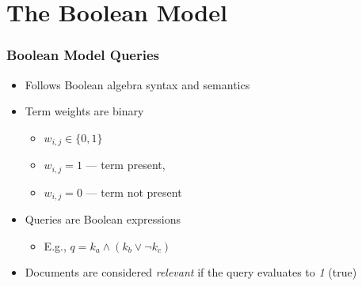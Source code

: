 \documentclass[svgnames]{beamer}
\newcommand{\wij}{\ensuremath{w_{i,j}}}
\begin{document}

\section{The Boolean Model}
\label{sec:boolean}


\begin{frame}
  \frametitle{Boolean Model Queries}

  \begin{block}{}
    \begin{itemize}
    \item Follows Boolean algebra syntax and semantics
    \item Term weights are binary 
      \begin{itemize}
      \item $\wij \in \{0,1\}$
      \item $\wij = 1$ --- term present,
      \item $\wij = 0$ --- term not present
      \end{itemize}
    \item Queries are Boolean expressions
      \begin{itemize}
      \item E.g., $q = k_a \wedge (k_b \vee \neg k_c)$
      \end{itemize}
    \item Documents are considered \emph{relevant} if the query evaluates to
      \textit{1} (true)
    \end{itemize}
  \end{block}

\end{frame}

\end{document}
